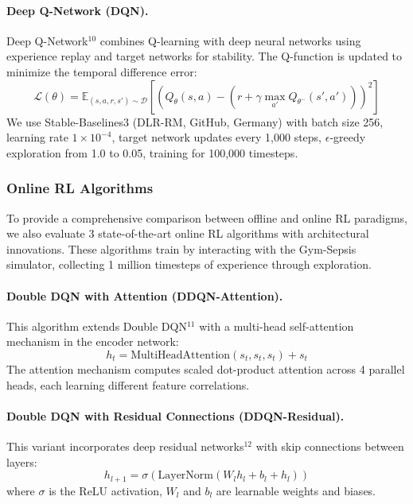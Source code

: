 \paragraph{Deep Q-Network (DQN).}
Deep Q-Network$^{10}$ combines Q-learning with deep neural networks using experience replay and target networks for stability. The Q-function is updated to minimize the temporal difference error:
\begin{equation}
\mathcal{L}(\theta) = \mathbb{E}_{(s,a,r,s') \sim \mathcal{D}} \left[ \left( Q_\theta(s,a) - \left( r + \gamma \max_{a'} Q_{\theta^-}(s', a') \right) \right)^2 \right]
\end{equation}
We use Stable-Baselines3 (DLR-RM, GitHub, Germany) with batch size 256, learning rate $1 \times 10^{-4}$, target network updates every 1,000 steps, $\epsilon$-greedy exploration from 1.0 to 0.05, training for 100,000 timesteps.

\subsubsection{Online RL Algorithms}

To provide a comprehensive comparison between offline and online RL paradigms, we also evaluate 3 state-of-the-art online RL algorithms with architectural innovations. These algorithms train by interacting with the Gym-Sepsis simulator, collecting 1 million timesteps of experience through exploration.

\paragraph{Double DQN with Attention (DDQN-Attention).}
This algorithm extends Double DQN$^{11}$ with a multi-head self-attention mechanism in the encoder network:
\begin{equation}
h_t = \text{MultiHeadAttention}(s_t, s_t, s_t) + s_t
\end{equation}
The attention mechanism computes scaled dot-product attention across 4 parallel heads, each learning different feature correlations.

\paragraph{Double DQN with Residual Connections (DDQN-Residual).}
This variant incorporates deep residual networks$^{12}$ with skip connections between layers:
\begin{equation}
h_{l+1} = \sigma(\text{LayerNorm}(W_l h_l + b_l + h_l))
\end{equation}
where $\sigma$ is the ReLU activation, $W_l$ and $b_l$ are learnable weights and biases.

